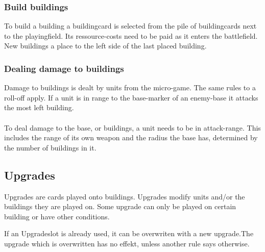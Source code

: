 \documentclass[a5paper,pagesize,10pt,bibtotoc,pointlessnumbers,
normalheadings,DIV=9,twoside=false]{scrbook}
\begin{document}
\subsubsection{Build buildings}
To build a building a buildingcard is selected from the pile of buildingcards next to the playingfield. Its ressource-costs need to be paid as it enters the battlefield.
New buildings a place to the left side of the last placed building.

\subsubsection{Dealing damage to buildings}
Damage to buildings is dealt by units from the micro-game. The same rules to a roll-off apply. If a unit is in range to the base-marker of an enemy-base it attacks the most left building.\\
\\
To deal damage to the base, or buildings, a unit needs to be in attack-range. This includes the range of its own weapon and the radius the base has, determined by the number of buildings in it.

\subsection{Upgrades}
Upgrades are cards played onto buildings. Upgrades modify units and/or the buildings they are played on. Some upgrade can only be played on certain building or have other conditions.

If an Upgradeslot is already used, it can be overwriten with a new upgrade.The upgrade which is overwritten has no effekt, unless another rule says otherwise.\\
\end{document}
